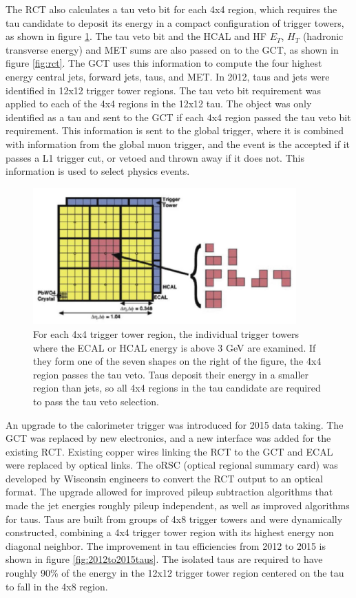 \documentclass[oneside, letterpaper, oldfontcommands]{memoir}
\begin{document}
\qquad The RCT also calculates a tau veto bit for each 4x4 region, which requires the tau candidate to deposit its energy in a compact configuration of trigger towers, as shown in figure \ref{fig:tauveto}. The tau veto bit and the HCAL and HF $E_{T}$, $H_{T}$ (hadronic transverse energy) and MET sums are also passed on to the GCT, as shown in figure \ref{fig:rct}. The GCT uses this information to compute the four highest energy central jets, forward jets, taus, and MET. In 2012, taus and jets were identified in 12x12 trigger tower regions. The tau veto bit requirement was applied to each of the 4x4 regions in the 12x12 tau. The object was only identified as a tau and sent to the GCT if each 4x4 region passed the tau veto bit requirement. This information is sent to the global trigger, where it is combined with information from the global muon trigger, and the event is the accepted if it passes a L1 trigger cut, or vetoed and thrown away if it does not. This information is used to select physics events. 

\begin{figure}[here]
\includegraphics[width=0.9\textwidth]{tauveto.jpg}
\caption{For each 4x4 trigger tower region, the individual trigger towers where the ECAL or HCAL energy is above 3 GeV are examined. If they form one of the seven shapes on the right of the figure, the 4x4 region passes the tau veto. Taus deposit their energy in a smaller region than jets, so all 4x4 regions in the tau candidate are required to pass the tau veto selection\cite{CMS-DP-2015-009}.}
\label{fig:tauveto}
\end{figure}

\qquad An upgrade to the calorimeter trigger was introduced for 2015 data taking. The GCT was replaced by new electronics, and a new interface was added for the existing RCT. Existing copper wires linking the RCT to the GCT and ECAL were replaced by optical links. The oRSC (optical regional summary card) was developed by Wisconsin engineers to convert the RCT output to an optical format. The upgrade allowed for improved pileup subtraction algorithms that made the jet energies roughly pileup independent, as well as improved algorithms for taus. Taus are built from groups of 4x8 trigger towers and were dynamically constructed, combining a 4x4 trigger tower region with its highest energy non diagonal neighbor. The improvement in tau efficiencies from 2012 to 2015 is shown in figure \ref{fig:2012to2015taus}. The isolated taus are required to have roughly 90\% of the energy in the 12x12 trigger tower region centered on the tau to fall in the 4x8 region.
\end{document}
